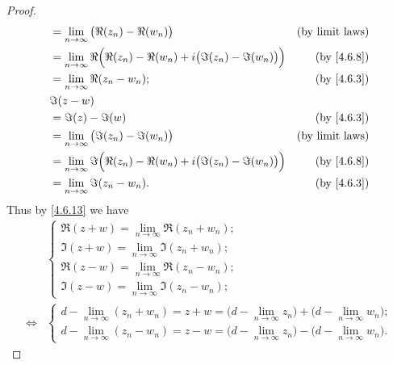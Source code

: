 \begin{proof}
\begin{align*}
     & = \lim_{n \to \infty} \big(\Re(z_n) - \Re(w_n)\big)                                      & \text{(by limit laws)}   \\
     & = \lim_{n \to \infty} \Re\Big(\Re(z_n) - \Re(w_n) + i \big(\Im(z_n) - \Im(w_n)\big)\Big) & \text{(by \cref{4.6.8})} \\
     & = \lim_{n \to \infty} \Re(z_n - w_n);                                                    & \text{(by \cref{4.6.3})} \\
     & \Im(z - w)                                                                                                          \\
     & = \Im(z) - \Im(w)                                                                        & \text{(by \cref{4.6.3})} \\
     & = \lim_{n \to \infty} \big(\Im(z_n) - \Im(w_n)\big)                                      & \text{(by limit laws)}   \\
     & = \lim_{n \to \infty} \Im\Big(\Re(z_n) - \Re(w_n) + i \big(\Im(z_n) - \Im(w_n)\big)\Big) & \text{(by \cref{4.6.8})} \\
     & = \lim_{n \to \infty} \Im(z_n - w_n).                                                    & \text{(by \cref{4.6.3})} \\
  \end{align*}
  Thus by \cref{4.6.13} we have
  \begin{align*}
         & \begin{cases}
             \Re(z + w) = \lim_{n \to \infty} \Re(z_n + w_n); \\
             \Im(z + w) = \lim_{n \to \infty} \Im(z_n + w_n); \\
             \Re(z - w) = \lim_{n \to \infty} \Re(z_n - w_n); \\
             \Im(z - w) = \lim_{n \to \infty} \Im(z_n - w_n);
           \end{cases}                                                                             \\
    \iff & \begin{cases}
             d - \lim_{n \to \infty} (z_n + w_n) = z + w = \big(d - \lim_{n \to \infty} z_n\big) + \big(d - \lim_{n \to \infty} w_n\big); \\
             d - \lim_{n \to \infty} (z_n - w_n) = z - w = \big(d - \lim_{n \to \infty} z_n\big) - \big(d - \lim_{n \to \infty} w_n\big).
           \end{cases}
  \end{align*}


\end{proof}
